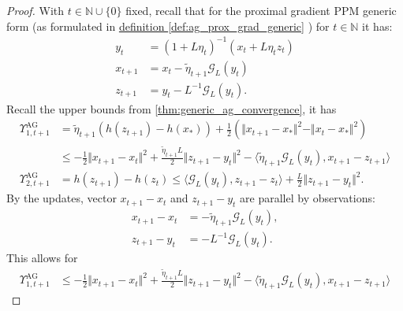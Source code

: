     \begin{proof}
        With $t \in \mathbb N \cup \{0\}$ fixed, 
        recall that for the proximal gradient PPM generic form 
        (as formulated in 
        \hyperref[def:ag_prox_grad_generic]{definition \ref*{def:ag_prox_grad_generic}}
        ) for $t\in \mathbb N$ it has: 
        \begin{align*}
            y_t &= (1 + L\eta_t)^{-1}(x_t + L\eta_t z_t)
            \\
            x_{t + 1} &= x_t - \tilde \eta_{t + 1} \mathcal G_L(y_t)
            \\
            z_{t + 1} &= y_t - L^{-1}\mathcal G_L(y_t). 
        \end{align*}
        Recall the upper bounds from 
        \ref*{thm:generic_ag_convergence}, 
        it has 
        \begin{align*}
            \Upsilon_{1, t + 1}^\text{AG}
            &= 
            \tilde\eta_{t + 1} (h(z_{t + 1}) - h(x_*)) + 
            \frac{1}{2} (
                \Vert x_{t + 1} - x_*\Vert^2
                - 
                \Vert x_t - x_*\Vert^2
            )
            \\
            &\le 
            - \frac{1}{2}\Vert x_{t + 1} - x_t\Vert^2 
            + \frac{\tilde\eta_{t + 1}L}{2}\Vert z_{t + 1} - y_t\Vert^2
            - \langle 
                \tilde\eta_{t + 1} \mathcal G_L(y_t), 
                x_{t + 1} - z_{t + 1}
            \rangle
            \\
            \Upsilon_{2, t + 1}^\text{AG}
            &= 
            h(z_{t + 1}) - h(z_t) 
            \le 
            \langle \mathcal G_L(y_t), z_{t + 1} - z_t\rangle + 
            \frac{L}{2}\Vert z_{t + 1} - y_t\Vert^2. 
        \end{align*}
        By the updates, vector $x_{t + 1} - x_t$ and $z_{t + 1} - y_t$ are parallel by observations: 
        \begin{align*}
            x_{t + 1} - x_t &= -\tilde\eta_{t + 1}\mathcal G_L(y_t), 
            \\
            z_{t + 1} - y_t &= -L^{-1}\mathcal G_L(y_t). 
        \end{align*}
        This allows for 
        \begin{align*}
            \Upsilon_{1, t + 1}^{\text{AG}} 
            &\le 
            - \frac{1}{2}\Vert x_{t + 1} - x_t\Vert^2 + 
            \frac{\tilde\eta_{t + 1}L}{2}\Vert z_{t + 1} - y_t\Vert^2 
            - 
            \langle \tilde\eta_{t + 1}\mathcal G_L (y_t), x_{t + 1} - z_{t + 1} \rangle

\end{align*}
\end{proof}
